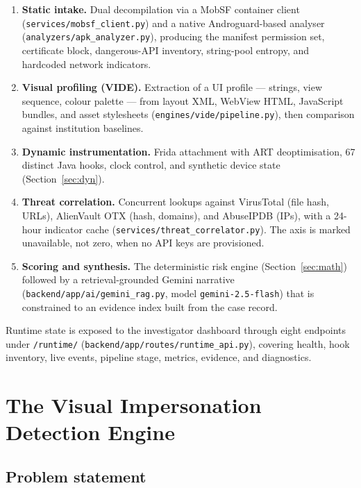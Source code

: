 \documentclass{article}
\begin{document}
\begin{enumerate}
\item \textbf{Static intake.} Dual decompilation via a MobSF container client
(\texttt{services/mobsf\_client.py}) and a native Androguard-based analyser
(\texttt{analyzers/apk\_analyzer.py}), producing the manifest permission set,
certificate block, dangerous-API inventory, string-pool entropy, and hardcoded
network indicators.
\item \textbf{Visual profiling (VIDE).} Extraction of a UI profile ---
strings, view sequence, colour palette --- from layout XML, WebView HTML,
JavaScript bundles, and asset stylesheets
(\texttt{engines/vide/pipeline.py}), then comparison against institution
baselines.
\item \textbf{Dynamic instrumentation.} Frida attachment with ART
deoptimisation, 67 distinct Java hooks, clock control, and synthetic device
state (Section~\ref{sec:dyn}).
\item \textbf{Threat correlation.} Concurrent lookups against VirusTotal
(file hash, URLs), AlienVault OTX (hash, domains), and AbuseIPDB (IPs), with a
24-hour indicator cache (\texttt{services/threat\_correlator.py}). The axis is
marked unavailable, not zero, when no API keys are provisioned.
\item \textbf{Scoring and synthesis.} The deterministic risk engine
(Section~\ref{sec:math}) followed by a retrieval-grounded Gemini narrative
(\texttt{backend/app/ai/gemini\_rag.py}, model \texttt{gemini-2.5-flash}) that
is constrained to an evidence index built from the case record.
\end{enumerate}

Runtime state is exposed to the investigator dashboard through eight endpoints
under \texttt{/runtime/} (\texttt{backend/app/routes/runtime\_api.py}), covering
health, hook inventory, live events, pipeline stage, metrics, evidence, and
diagnostics.

\section{The Visual Impersonation Detection Engine}
\label{sec:vide}

\subsection{Problem statement}
\label{ssec:vide-problem}
\end{document}
